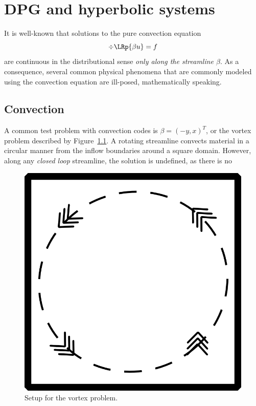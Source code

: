 \chapter{DPG and hyperbolic systems}

It is well-known that solutions to the pure convection equation
\[
\div \LRp{\beta u} = f
\]
are continuous in the distributional sense \emph{only along the streamline $\beta$}. As a consequence, several common physical phenomena that are commonly modeled using the convection equation are ill-posed, mathematically speaking. 

\section{Convection}

A common test problem with convection codes is $\beta = (-y,x)^T$, or the vortex problem described by Figure~\ref{fig:convCirc}. A rotating streamline convects material in a circular manner from the inflow boundaries around a square domain. However, along any \emph{closed loop} streamline, the solution is undefined, as there is no 

\begin{figure}[!h]
\centering
\includegraphics[scale = .25]{figs/convCirc.png}
\caption{Setup for the vortex problem.}
\label{fig:convCirc}
\end{figure}


